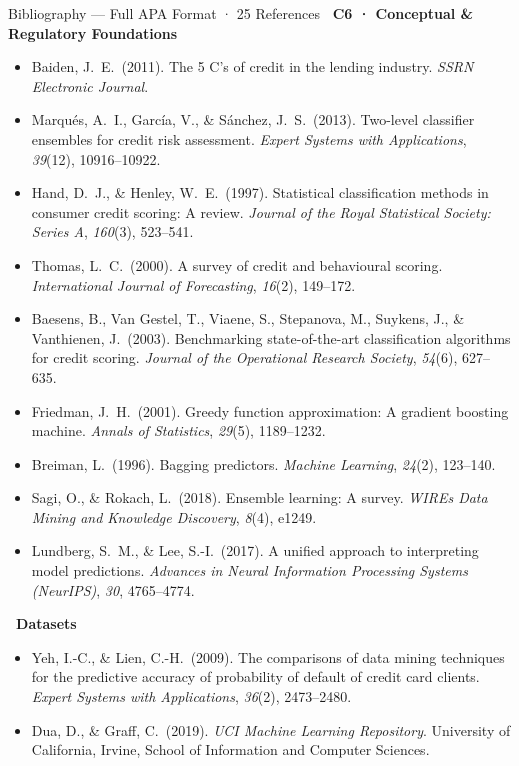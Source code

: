 \documentclass[9pt,aspectratio=169]{beamer}
\begin{document}
\begin{frame}[allowframebreaks]{Bibliography \textnormal{\footnotesize --- Full APA Format · 25 References}}
\noindent\colorbox{gray!25}{\scriptsize\textbf{~C6 · Conceptual \& Regulatory Foundations~}}\\[2pt]
\begin{itemize}\setlength\itemsep{2pt}
  \item Baiden, J.\ E.\ (2011). The 5 C's of credit in the lending industry. \textit{SSRN Electronic Journal}.
  \item Marqu\'{e}s, A.\ I., Garc\'{i}a, V., \& S\'{a}nchez, J.\ S.\ (2013). Two-level classifier ensembles for credit risk assessment. \textit{Expert Systems with Applications}, \textit{39}(12), 10916--10922.
  \item Hand, D.\ J., \& Henley, W.\ E.\ (1997). Statistical classification methods in consumer credit scoring: A review. \textit{Journal of the Royal Statistical Society: Series A}, \textit{160}(3), 523--541.
  \item Thomas, L.\ C.\ (2000). A survey of credit and behavioural scoring. \textit{International Journal of Forecasting}, \textit{16}(2), 149--172.
  \item Baesens, B., Van Gestel, T., Viaene, S., Stepanova, M., Suykens, J., \& Vanthienen, J.\ (2003). Benchmarking state-of-the-art classification algorithms for credit scoring. \textit{Journal of the Operational Research Society}, \textit{54}(6), 627--635.
  \item Friedman, J.\ H.\ (2001). Greedy function approximation: A gradient boosting machine. \textit{Annals of Statistics}, \textit{29}(5), 1189--1232.
  \item Breiman, L.\ (1996). Bagging predictors. \textit{Machine Learning}, \textit{24}(2), 123--140.
  \item Sagi, O., \& Rokach, L.\ (2018). Ensemble learning: A survey. \textit{WIREs Data Mining and Knowledge Discovery}, \textit{8}(4), e1249.
  \item Lundberg, S.\ M., \& Lee, S.-I.\ (2017). A unified approach to interpreting model predictions. \textit{Advances in Neural Information Processing Systems (NeurIPS)}, \textit{30}, 4765--4774.
\end{itemize}\vspace{4pt}

\noindent\colorbox{steelblue!15}{\scriptsize\textbf{~Datasets~}}\\[2pt]
\begin{itemize}\setlength\itemsep{2pt}
  \item Yeh, I.-C., \& Lien, C.-H.\ (2009). The comparisons of data mining techniques for the predictive accuracy of probability of default of credit card clients. \textit{Expert Systems with Applications}, \textit{36}(2), 2473--2480.
  \item Dua, D., \& Graff, C.\ (2019). \textit{UCI Machine Learning Repository}. University of California, Irvine, School of Information and Computer Sciences.
\end{itemize}

\end{frame}
\end{document}
